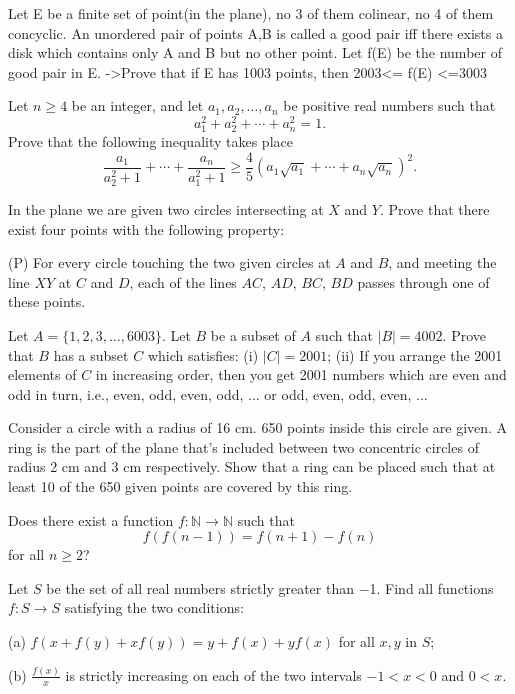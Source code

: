 \bq{}{}
Let E be a finite set of point(in the plane), no 3
of them colinear, no 4 of them concyclic. An unordered
pair of points {A,B} is called a good pair iff there exists
a disk which contains only A and B but no other point.
Let f(E) be the number of good pair in E.
->Prove that if E has 1003 points, then
2003<= f(E) <=3003
\eq

Let $n\geq 4$ be an integer, and let $a_1,a_2,\ldots,a_n$ be positive real numbers such that \[ a_1^2+a_2^2+\cdots +a_n^2=1 . \] Prove that the following inequality takes place \[ \frac{a_1}{a_2^2+1}+\cdots +\frac{a_n}{a_1^2+1} \geq \frac{4}{5}\left( a_1 \sqrt{a_1}+\cdots +a_n \sqrt{a_n} \right)^2 . \]
\eq

In the plane we are given two circles intersecting at $ X$ and $ Y$. Prove that there exist four points with the following property:

(P) For every circle touching the two given circles at $ A$ and $ B$, and meeting the line $ XY$ at $ C$ and $ D$, each of the lines $ AC$, $ AD$, $ BC$, $ BD$ passes through one of these points.
\eq

\bq{}{}
Let $A = \{1, 2, 3, \ldots, 6003\}$. Let $B$ be a subset of $A$ such that $|B| = 4002$. Prove that $B$ has a subset $C$ which satisfies:
(i) $|C| = 2001$;
(ii) If you arrange the 2001 elements of $C$ in increasing order, then you get 2001 numbers which are even and odd in turn, i.e., even, odd, even, odd, ... or odd, even, odd, even, ...
\eq

\bq{}{}
Consider a circle with a radius of 16 cm. 650 points inside this circle are given.
A ring is the part of the plane that's included between two concentric circles of radius 2 cm and 3 cm respectively.
Show that a ring can be placed such that at least 10 of the 650 given points are covered by this ring.
\eq

\bq{}{}
Does there exist a function $f:\mathbb N\to\mathbb N$ such that
\[f(f(n-1)) = f(n+1) -f(n) \] for all $n \geq 2$?
\eq

Let $ S$ be the set of all real numbers strictly greater than −1. Find all functions $ f: S \to S$ satisfying the two conditions:

(a) $ f(x + f(y) + xf(y)) = y + f(x) + yf(x)$ for all $ x, y$ in $ S$;

(b) $ \frac {f(x)}{x}$ is strictly increasing on each of the two intervals $ - 1 < x < 0$ and $ 0 < x$.
\eq

